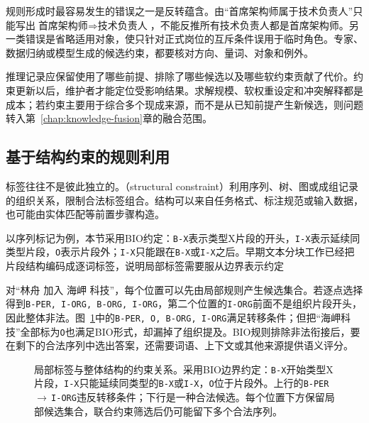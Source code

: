 规则形成时最容易发生的错误之一是反转蕴含。由“首席架构师属于技术负责人”只能写出$\text{首席架构师}\Rightarrow\text{技术负责人}$，不能反推所有技术负责人都是首席架构师。另一类错误是省略适用对象，使只针对正式岗位的互斥条件误用于临时角色。专家、数据归纳或模型生成的候选约束，都要核对方向、量词、对象和例外。

推理记录应保留使用了哪些前提、排除了哪些候选以及哪些软约束贡献了代价。约束更新以后，维护者才能定位受影响结果。求解规模、软权重设定和冲突解释都是成本；若约束主要用于综合多个现成来源，而不是从已知前提产生新候选，则问题转入第~\ref{chap:knowledge-fusion}章的融合范围。

\subsection{基于结构约束的规则利用}
\label{sec:rule-based-knowledge-acquisition-structural-constraint}

标签往往不是彼此独立的。（structural constraint）利用序列、树、图或成组记录的组织关系，限制合法标签组合。结构可以来自任务格式、标注规范或输入数据，也可能由实体匹配等前置步骤构造。

以序列标记为例，本节采用BIO约定：\texttt{B-X}表示类型X片段的开头，\texttt{I-X}表示延续同类型片段，\texttt{O}表示片段外；\texttt{I-X}只能跟在\texttt{B-X}或\texttt{I-X}之后。早期文本分块工作已经把片段结构编码成逐词标签，说明局部标签需要服从边界表示约定

对“林舟 加入 海岬 科技”，每个位置可以先由局部规则产生候选集合。若逐点选择得到\texttt{B-PER, I-ORG, B-ORG, I-ORG}，第二个位置的\texttt{I-ORG}前面不是组织片段开头，因此整体非法。图~\ref{fig:rule-based-knowledge-acquisition-sequence-constraint}中的\texttt{B-PER, O, B-ORG, I-ORG}满足转移条件；但把“海岬科技”全部标为\texttt{O}也满足BIO形式，却漏掉了组织提及。BIO规则排除非法衔接后，要在剩下的合法序列中选出答案，还需要词语、上下文或其他来源提供语义评分。

\begin{figure}[htbp]
  \centering
  
  \caption{局部标签与整体结构的约束关系。采用BIO边界约定：\texttt{B-X}开始类型X片段，\texttt{I-X}只能延续同类型的\texttt{B-X}或\texttt{I-X}，\texttt{O}位于片段外。上行的\texttt{B-PER}\,$\to$\,\texttt{I-ORG}违反转移条件；下行是一种合法候选。每个位置下方保留局部候选集合，联合约束筛选后仍可能留下多个合法序列。}
  \label{fig:rule-based-knowledge-acquisition-sequence-constraint}
\end{figure}

